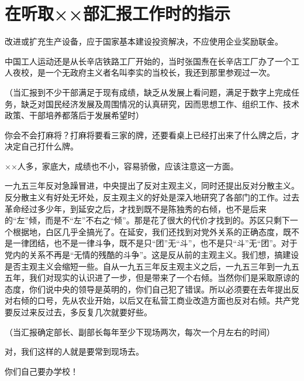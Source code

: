 \section[在听取××部汇报工作时的指示（一九五六年三月六日）]{在听取××部汇报工作时的指示}


改进或扩充生产设备，应于国家基本建设投资解决，不应使用企业奖励联金。

中国工人运动还是从长辛店铁路工厂开始的，当时张国焘在长辛店工厂办了一个工人夜校，是一个无政府主义者名叫李实的当校长，我还到那里参观过一次。

（当汇报到不少干部满足于现有成绩，缺乏从发展上看问题，满足于数字上完成任务，缺乏对国民经济发展及周围情况的认真研究，因而思想工作、组织工作、技术政策、干部培养都落后于发展希望时）

你会不会打麻将？打麻将要看三家的牌，还要看桌上已经打出来了什么牌之后，才决定自己打什么牌。

××人多，家底大，成绩也不小，容易骄傲，应该注意这一方面。

一九五三年反对急躁冒进，中央提出了反对主观主义，同时还提出反对分散主义。反分散主义有好处无坏处，反主观主义的好处是深入地研究了各部门的工作。过去革命经过多少年，到延安之后，才找到既不是陈独秀的右倾，也不是后来的“左”倾，而是不“左”不右之“倾”。那是花了很大的代价才找到的。苏区只剩下一个根据地，白区几乎全搞光了。在延安，我们还找到对党外关系的正确态度，既不是一律团结，也不是一律斗争，既不是只“团”无“斗”，也不是只“斗”无“团”。对于党内的关系不再是“无情的残酷的斗争”。这是反从前的主观主义。我们想，搞建设是否主观主义会缩短一些。自从一九五三年反主观主义之后，一九五三年到一九五五年，我们对现实的认识进了一步，但是带来了一个右倾。当然你们是采取原谅的态度，你们说中央的领导是英明的，你们自己犯了错误。所以必须要在去年提出反对右倾的口号，先从农业开始，以后又在私营工商业改造方面也反对右倾。共产党要反过来反过去，多反复几次就要好些。

（当汇报确定部长、副部长每年至少下现场两次，每次一个月左右的时间）

对，我们这样的人就是要常到现场去。

你们自己要办学校！


